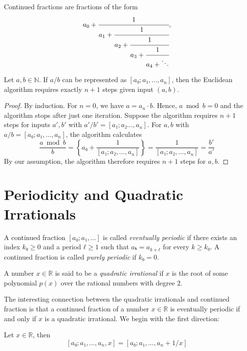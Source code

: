 Continued fractions are fractions of the form
\[
  a_0 + \cfrac{1}{a_1 + \cfrac{1}{a_2 + \cfrac{1}{a_3 + \cfrac{1}{a_4 + \ddots}}}},
\]

\begin{proposition}
  Let $a, b ∈ ℕ$.
  If $a/b$ can be represented as $[a₀; a₁, \dots, a_n]$, then the Euclidean
  algorithm requires exactly $n + 1$ steps given input $(a, b)$.
\end{proposition}

\begin{proof}
  By induction.
  For $n = 0$, we have $a = a_n · b$.
  Hence, $a \bmod b = 0$ and the algorithm stops after just one iteration.
  Suppose the algorithm requires $n + 1$ steps for inputs $a', b'$ with $a'/b' = [a₁; a₂ \dots, a_n]$.
  For $a, b$ with $a/b = [a₀; a₁, \dots, a_n]$, the algorithm calculates
  \[
    \frac{a \bmod b}{b} = \left\{a₀ + \frac{1}{[a₁; a₂, \dots, a_n]} \right\} = \frac{1}{[a₁; a₂, \dots, a_n]} = \frac{b'}{a'}
  \]
  By our assumption, the algorithm therefore requires $n + 1$ steps for $a, b$.
\end{proof}

\section{Periodicity and Quadratic Irrationals}

\begin{definition}
  A continued fraction $[a₀; a₁, …]$ is called \emph{eventually periodic}
  if there exists an index $k₀ ≥ 0$ and a period $ℓ ≥ 1$ such that $aₖ = a_{k+ℓ}$ for every $k ≥ k₀$.
  A continued fraction is called \emph{purely periodic} if $k₀ = 0$.
\end{definition}

\begin{definition}
  A number $x ∈ ℝ$ is said to be a \emph{quadratic irrational} if $x$ is the root of some
  polynomial $p(x)$ over the rational numbers with degree $2$.
\end{definition}

The interesting connection between the quadratic irrationals and continued
fraction is that a continued fraction of a number $x ∈ ℝ$ is eventually
periodic if and only if $x$ is a quadratic irrational.
We begin with the first direction:

\begin{lemma}
  Let $x ∈ ℝ$, then
  \[
    [a₀; a₁, …, a_n, x] = [a₀; a₁, …, a_n + 1/x]
  \]
\end{lemma}

